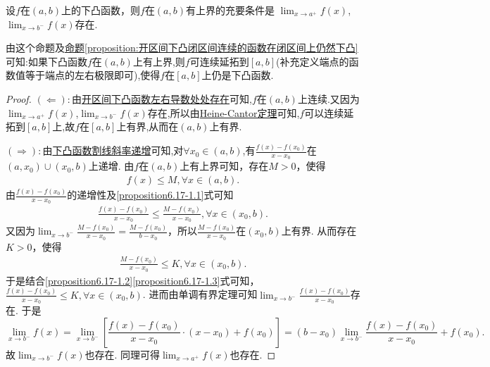 \documentclass[../../main.tex]{subfiles}%
\begin{document}
\begin{proposition}\label{proposition:开区间的下凸函数有上界的充要条件}
设\(f\)在\((a,b)\)上的下凸函数，则\(f\)在\((a,b)\)有上界的充要条件是
$\lim_{x\rightarrow a^{+}}f(x)$,$\lim_{x\rightarrow b^{-}}f(x)$存在.
\end{proposition}
\begin{note}
由这个命题及\hyperref[proposition:开区间下凸闭区间连续的函数在闭区间上仍然下凸]{命题\ref{proposition:开区间下凸闭区间连续的函数在闭区间上仍然下凸}}可知:如果下凸函数$f$在$(a,b)$上有上界,则$f$可连续延拓到$[a,b]$(补充定义端点的函数值等于端点的左右极限即可),使得$f$在$[a,b]$上仍是下凸函数.
\end{note}
\begin{proof}

$(\Leftarrow):$由\hyperref[theorem:开区间下凸函数左右导数处处存在]{开区间下凸函数左右导数处处存在}可知,$f$在$(a,b)$上连续.又因为$\lim_{x\rightarrow a^{+}}f(x)$,$\lim_{x\rightarrow b^{-}}f(x)$存在,所以由\hyperref[theroem:Heine-Cantor定理]{Heine-Cantor定理}可知,$f$可以连续延拓到$[a,b]$上,故$f$在$[a,b]$上有界,从而在$(a,b)$上有界.

$(\Rightarrow):$由\hyperref[下凸函数割线斜率递增]{下凸函数割线斜率递增}可知,对$\forall x_0\in (a,b)$,有\(\frac{f(x) - f(x_0)}{x - x_0}\)在\((a, x_0)\cup(x_0, b)\)上递增. 由\(f\)在\((a, b)\)上有上界可知，存在\(M > 0\)，使得
\begin{align}
f(x)\leqslant M, \forall x\in(a, b). \label{proposition6.17-1.1}
\end{align}
由\(\frac{f(x) - f(x_0)}{x - x_0}\)的递增性及\eqref{proposition6.17-1.1}式可知
\begin{align}
\frac{f(x) - f(x_0)}{x - x_0}\leqslant\frac{M - f(x_0)}{x - x_0}, \forall x\in(x_0, b). \label{proposition6.17-1.2}
\end{align}
又因为\(\lim_{x\rightarrow b^-}\frac{M - f(x_0)}{x - x_0}=\frac{M - f(x_0)}{b - x_0}\)，所以\(\frac{M - f(x_0)}{x - x_0}\)在\((x_0, b)\)上有界. 从而存在\(K > 0\)，使得
\begin{align}
\frac{M - f(x_0)}{x - x_0}\leqslant K, \forall x\in(x_0, b).
\label{proposition6.17-1.3}  
\end{align}
于是结合\eqref{proposition6.17-1.2}\eqref{proposition6.17-1.3}式可知，\(\frac{f(x) - f(x_0)}{x - x_0}\leqslant K, \forall x\in(x_0, b)\). 进而由单调有界定理可知\(\lim_{x\rightarrow b^-}\frac{f(x) - f(x_0)}{x - x_0}\)存在. 于是
\[
\lim_{x\rightarrow b^-}f(x)=\lim_{x\rightarrow b^-}\left[\frac{f(x) - f(x_0)}{x - x_0}\cdot(x - x_0)+f(x_0)\right]=(b - x_0)\lim_{x\rightarrow b^-}\frac{f(x) - f(x_0)}{x - x_0}+f(x_0).
\]
故\(\lim_{x\rightarrow b^-}f(x)\)也存在. 同理可得\(\lim_{x\rightarrow a^+}f(x)\)也存在.


\end{proof}
\end{document}
